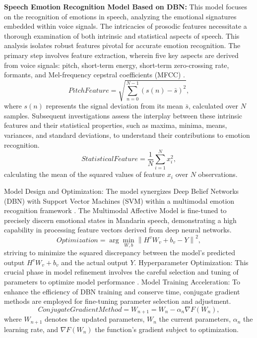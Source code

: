 \documentclass[preprint,12pt]{elsarticle}
\begin{document}
\textbf{Speech Emotion Recognition Model Based on DBN:} This model focuses on the recognition of emotions in speech, analyzing the emotional signatures embedded within voice signals. The intricacies of prosodic features necessitate a thorough examination of both intrinsic and statistical aspects of speech. This analysis isolates robust features pivotal for accurate emotion recognition. The primary step involves feature extraction, wherein five key aspects are derived from voice signals: pitch, short-term energy, short-term zero-crossing rate, formants, and Mel-frequency cepstral coefficients (MFCC) \cite{ref31}. 
\begin{equation}
Pitch Feature = \sqrt{\sum_{n=0}^{N-1}(s(n) - \bar{s})^2},
\end{equation}
where \( s(n) \) represents the signal deviation from its mean \( \bar{s} \), calculated over \( N \) samples. Subsequent investigations assess the interplay between these intrinsic features and their statistical properties, such as maxima, minima, means, variances, and standard deviations, to understand their contributions to emotion recognition.
\begin{equation}
Statistical Feature = \frac{1}{N}\sum_{i=1}^{N}x_{i}^{2},
\end{equation}
calculating the mean of the squared values of feature \( x_{i} \) over \( N \) observations.

Model Design and Optimization: The model synergizes Deep Belief Networks (DBN) with Support Vector Machines (SVM) within a multimodal emotion recognition framework \cite{ref32}. The Multimodal Affective Model is fine-tuned to precisely discern emotional states in Mandarin speech, demonstrating a high capability in processing feature vectors derived from deep neural networks.
\begin{equation}
Optimization= \arg\min_{W,b} \left\| H^v W_v + b_v - Y \right\|^2,
\end{equation}
striving to minimize the squared discrepancy between the model's predicted output \( H^v W_v + b_v \) and the actual output \( Y \). Hyperparameter Optimization: This crucial phase in model refinement involves the careful selection and tuning of parameters to optimize model performance \cite{ref33}. Model Training Acceleration: To enhance the efficiency of DBN training and conserve time, conjugate gradient methods are employed for fine-tuning parameter selection and adjustment.
\begin{equation}
Conjugate Gradient Method = W_{n+1} = W_n - \alpha_n \nabla F(W_n),
\end{equation}
where \( W_{n+1} \) denotes the updated parameters, \( W_n \) the current parameters, \( \alpha_n \) the learning rate, and \( \nabla F(W_n) \) the function's gradient subject to optimization.
\end{document}
